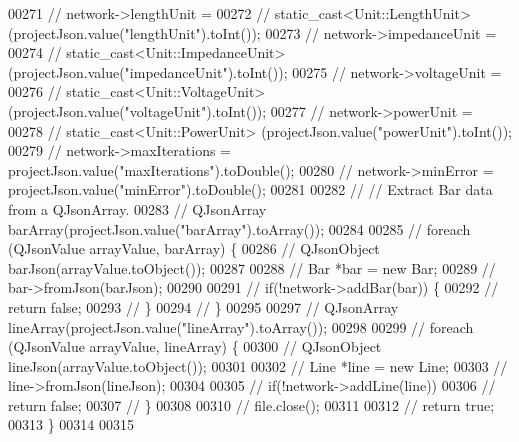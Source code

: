 \begin{DoxyCode}
00271 \textcolor{comment}{//  network->lengthUnit =}
00272 \textcolor{comment}{//    static\_cast<Unit::LengthUnit> (projectJson.value("lengthUnit").toInt());}
00273 \textcolor{comment}{//  network->impedanceUnit =}
00274 \textcolor{comment}{//    static\_cast<Unit::ImpedanceUnit> (projectJson.value("impedanceUnit").toInt());}
00275 \textcolor{comment}{//  network->voltageUnit =}
00276 \textcolor{comment}{//    static\_cast<Unit::VoltageUnit> (projectJson.value("voltageUnit").toInt());}
00277 \textcolor{comment}{//  network->powerUnit =}
00278 \textcolor{comment}{//    static\_cast<Unit::PowerUnit> (projectJson.value("powerUnit").toInt());}
00279 \textcolor{comment}{//  network->maxIterations = projectJson.value("maxIterations").toDouble();}
00280 \textcolor{comment}{//  network->minError = projectJson.value("minError").toDouble();}
00281 
00282 \textcolor{comment}{//  // Extract Bar data from a QJsonArray.}
00283 \textcolor{comment}{//  QJsonArray barArray(projectJson.value("barArray").toArray());}
00284 
00285 \textcolor{comment}{//  foreach (QJsonValue arrayValue, barArray) \{}
00286 \textcolor{comment}{//    QJsonObject barJson(arrayValue.toObject());}
00287 
00288 \textcolor{comment}{//    Bar *bar = new Bar;}
00289 \textcolor{comment}{//    bar->fromJson(barJson);}
00290 
00291 \textcolor{comment}{//    if(!network->addBar(bar)) \{}
00292 \textcolor{comment}{//      return false;}
00293 \textcolor{comment}{//    \}}
00294 \textcolor{comment}{//  \}}
00295 
00297 \textcolor{comment}{//  QJsonArray lineArray(projectJson.value("lineArray").toArray());}
00298 
00299 \textcolor{comment}{//  foreach (QJsonValue arrayValue, lineArray) \{}
00300 \textcolor{comment}{//    QJsonObject lineJson(arrayValue.toObject());}
00301 
00302 \textcolor{comment}{//    Line *line = new Line;}
00303 \textcolor{comment}{//    line->fromJson(lineJson);}
00304 
00305 \textcolor{comment}{//    if(!network->addLine(line))}
00306 \textcolor{comment}{//      return false;}
00307 \textcolor{comment}{//  \}}
00308 
00310 \textcolor{comment}{//  file.close();}
00311 
00312 \textcolor{comment}{//  return true;}
00313 \}
00314 
00315 
\end{DoxyCode}

